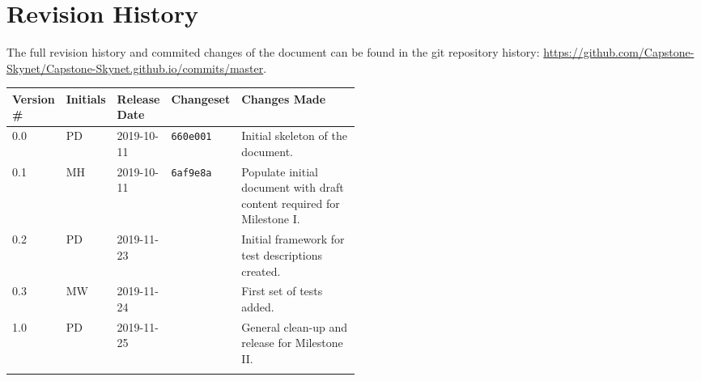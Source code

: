 \thispagestyle{empty}
\section*{Revision History}
The full revision history and commited changes of the document can be found in the git repository history: \href{https://github.com/Capstone-Skynet/Capstone-Skynet.github.io}{https://github.com/Capstone-Skynet/Capstone-Skynet.github.io/commits/master}.

\begin{table}[H]
\begin{tabular}{*{4}{l}p{0.5\linewidth}}
\hline
Version \# & Initials & Release Date & Changeset & Changes Made \\ \hline

0.0 & PD & 2019-10-11 & \texttt{660e001} & Initial skeleton of the document.\\
0.1 & MH & 2019-10-11 & \texttt{6af9e8a} & Populate initial document with draft content required for Milestone I.\\
0.2 & PD & 2019-11-23 & & Initial framework for test descriptions created.\\
0.3 & MW & 2019-11-24 & & First set of tests added.\\
1.0 & PD & 2019-11-25 & & General clean-up and release for Milestone II.\\

 & & & \\ \hline
\end{tabular}
\end{table}
